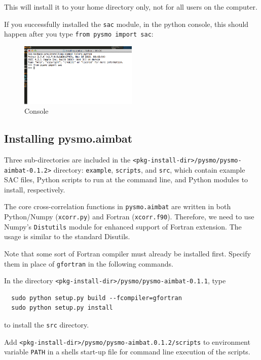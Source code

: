 \documentclass[letterpaper,10pt]{article}
\begin{document}
This will install it to your home directory only, not for all users on the computer. 

If you successfully installed the \verb"sac" module, in the python console, this should happen after you type \verb"from pysmo import sac": 

\begin{figure}[h!]
  \centering
  \includegraphics[width=0.5\textwidth]{images/sac_installed}
  \caption{Console}
  \label{fig:sac_installed}
\end{figure}


\subsection{Installing pysmo.aimbat}

Three sub-directories are included in the \verb"<pkg-install-dir>/pysmo/pysmo-aimbat-0.1.2>" directory: \verb"example", \verb"scripts", and \verb"src", which contain example SAC files, Python scripts to run at the command line, and Python modules to install, respectively.

The core cross-correlation functions in \verb"pysmo.aimbat" are written in both Python/Numpy (\verb"xcorr.py") and Fortran (\verb"xcorr.f90"). Therefore, we need to use Numpy's \verb"Distutils" module for enhanced support of Fortran extension. The usage is similar to the standard Disutils. 

Note that some sort of Fortran compiler must already be installed first. Specify them in place of \verb"gfortran" in the following commands.

In the directory \verb"<pkg-install-dir>/pysmo/pysmo-aimbat-0.1.1", type

\begin{verbatim}
  sudo python setup.py build --fcompiler=gfortran
  sudo python setup.py install 
\end{verbatim}

to install the \verb"src" directory. 

Add \verb"<pkg-install-dir>/pysmo/pysmo-aimbat.0.1.2/scripts" to environment variable \verb"PATH" in a shells start-up file for command line execution of the scripts.
\end{document}
